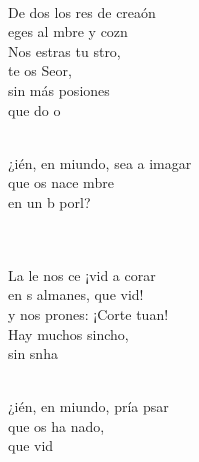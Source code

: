 \documentclass[12pt]{article}
\begin{document}
\begin{multicols*}{2}
\begin{cancion}
	  \\
	De dos los res de  creaón\\
	eges al mbre y  cozn \\
	Nos estras tu stro, \\
	te os Seor,\\
	sin más posiones \\
	que do  o \\\jump\\
	\begin{chorus}%
	¿ién, en miundo, sea a imagar \\
	que os nace mbre\\
	en un b porl?  \\
	\end{chorus}%
	\jump\\
	   \\
	La le nos ce ¡vid a corar\\
	en s almanes, que  vid! \\
	y  nos prones: ¡Corte tuan! \\
	Hay muchos sincho, \\
	sin snha\\\jump\\
	\begin{chorus}%
	¿ién, en miundo, pría psar \\
	que os ha nado,\\
	que  vid \\
	\end{chorus}%

\end{cancion}
\end{multicols*}
\end{document}
